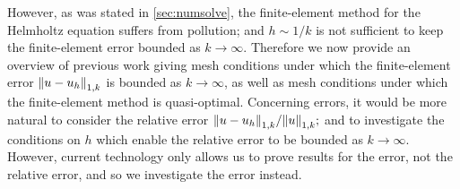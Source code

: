 However, as was stated in \cref{sec:numsolve}, the finite-element method for the Helmholtz equation suffers from pollution; and $h \sim 1/k$ is not sufficient to keep the finite-element error bounded as $k\rightarrow \infty.$ Therefore we  now provide an overview of previous work giving mesh conditions under which the finite-element error $\NW{u-\uh}$ is bounded as $k\rightarrow \infty$, as well as mesh conditions under which the finite-element method is quasi-optimal. Concerning errors, it would be more natural to consider the relative error $\NW{u-\uh}/\NW{u};$ and to investigate the conditions on $h$ which enable the relative error to be bounded as $k\rightarrow \infty.$ However, current technology only allows us to prove results for the error, not the relative error, and so we investigate the error instead.







